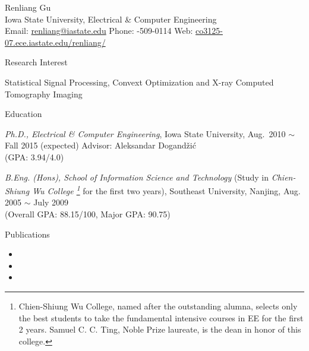 \documentclass[10pt]{article}
\begin{document}
\newlength{\oldcvlabelwidth}
\newlength{\oldcvlabelsep}
\newlength{\oldtemp}

\begin{cv}{{\large Renliang Gu}\\
  {\normalsize Iowa State University, Electrical \& Computer Engineering\\
    Email: {\mdseries \href{mailto:renliang@iastate.edu} 
    {renliang@iastate.edu}}
    \hfill Phone: {-509-0114}
    \hfill Web: {\mdseries \href{http://co3125-07.ece.iastate.edu/renliang/}
    {co3125-07.ece.iastate.edu/renliang/}}
  }
}

\setlength{\oldcvlabelwidth}{\cvlabelwidth}
\setlength{\oldcvlabelsep}{\cvlabelsep}

\setlength{\cvlabelwidth}{1em}

\begin{cvlist}{Research Interest}
\item Statistical Signal Processing, Convext Optimization and X-ray 
Computed Tomography Imaging
\end{cvlist}

\begin{cvlist}{Education}
\item \emph{Ph.D., Electrical \& Computer Engineering}, Iowa State 
  University, Aug.\ 2010 $\sim$ Fall 2015 (expected)
  Advisor: Aleksandar Dogand\v{z}i\'c\\
  (GPA: 3.94/4.0)
\item \emph{B.Eng. (Hons), School of Information Science and Technology} 
  (Study in \emph{Chien-Shiung Wu College \footnote{
    Chien-Shiung Wu College, named after the outstanding alumna, selects 
    only the best students to take the fundamental intensive courses in EE for 
    the first 2 years. Samuel C. C. Ting, Noble Prize laureate, is the dean in 
    honor of this college.
  }} for the first two years), Southeast University, Nanjing, Aug.  2005 
$\sim$ July 2009
\\(Overall GPA: 88.15/100, Major GPA: 90.75)
\end{cvlist}

\setlength{\cvlabelwidth}{0em}
\setlength{\cvlabelsep}{\labelsep}
\begin{cvlist}{Publications}
\item
\begin{itemize}\itemsep=0.25em
    \item {}
    \item {}
    \item {}


\end{itemize}
\end{cvlist}
\end{cv}
\end{document}
